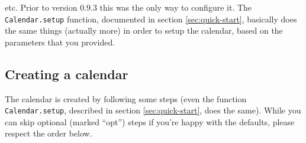 \documentclass[a4paper,twoside,10pt]{dynadoc}
\begin{document}
\noindent etc.  Prior to version
0.9.3 this was the only way to configure it.  The \texttt{Calendar.setup}
function, documented in section \ref{sec:quick-start}, basically does the same
things (actually more) in order to setup the calendar, based on the parameters
that you provided.

\subsection{Creating a calendar}

The calendar is created by following some steps (even the function
\texttt{Calendar.setup}, described in section \ref{sec:quick-start}, does the
same).  While you can skip optional (marked ``opt'') steps if you're happy with
the defaults, please respect the order below.
\end{document}
